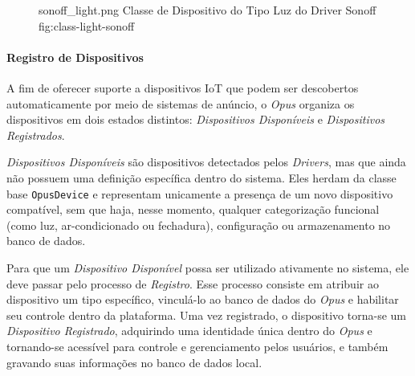 \begin{figure}[H]
    {sonoff_light.png}
    {Classe de Dispositivo do Tipo Luz do Driver Sonoff}
    {fig:class-light-sonoff}
\end{figure}


\paragraph{Registro de Dispositivos}
A fim de oferecer suporte a dispositivos IoT que podem ser descobertos automaticamente por meio de sistemas de anúncio,
o \emph{Opus} organiza os dispositivos em dois estados distintos: \emph{Dispositivos Disponíveis} e \emph{Dispositivos Registrados}.

\emph{Dispositivos Disponíveis} são dispositivos detectados pelos \emph{Drivers}, mas que ainda não possuem uma definição
específica dentro do sistema. Eles herdam da classe base \texttt{OpusDevice} e representam unicamente a presença de um novo
dispositivo compatível, sem que haja, nesse momento, qualquer categorização funcional (como luz, ar-condicionado ou fechadura),
configuração ou armazenamento no banco de dados.

Para que um \emph{Dispositivo Disponível} possa ser utilizado ativamente no sistema, ele deve passar pelo processo de \emph{Registro}.
Esse processo consiste em atribuir ao dispositivo um tipo específico, vinculá-lo ao banco de dados do \emph{Opus} e habilitar seu controle
dentro da plataforma. Uma vez registrado, o dispositivo torna-se um \emph{Dispositivo Registrado}, adquirindo uma identidade
única dentro do \emph{Opus} e tornando-se acessível para controle e gerenciamento pelos usuários, e também gravando suas informações
no banco de dados local.